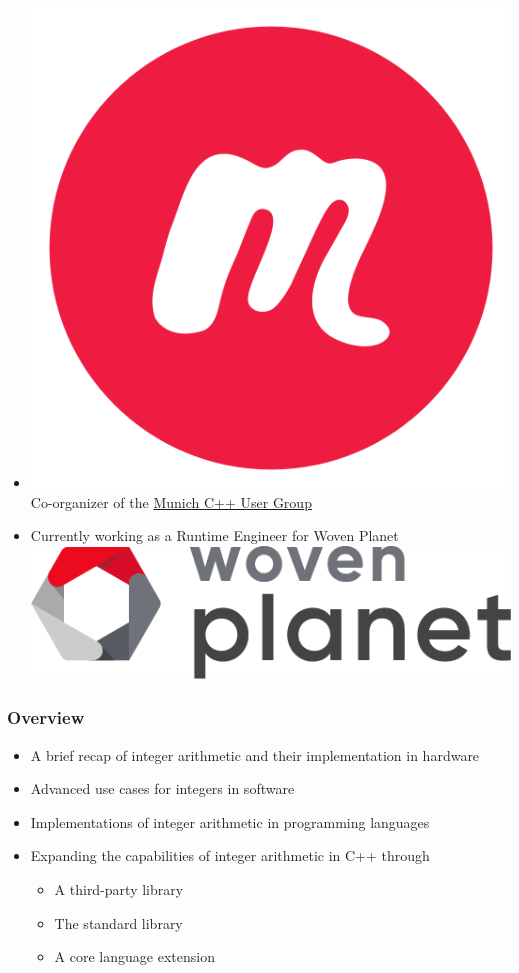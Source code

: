\documentclass[aspectratio=169]{beamer}
\begin{document}
\begin{frame}[fragile]
\begin{itemize}
    \item \includegraphics[height=.05\textheight]{resources/meetup-icon.png} Co-organizer of the \href{https://www.meetup.com/MUCplusplus/}{Munich C++ User Group}

    \item Currently working as a Runtime Engineer for Woven Planet \includegraphics[height=.1\textheight]{resources/Woven_Planet_Holdings_Logo.png}

  \end{itemize}
\end{frame}


\begin{frame}
  \frametitle{Overview}
  \begin{itemize}
  \item A brief recap of integer arithmetic and their implementation in hardware
  \item Advanced use cases for integers in software
  \item Implementations of integer arithmetic in programming languages
  \item Expanding the capabilities of integer arithmetic in C++ through
  \begin{itemize}
    \item A third-party library
    \item The standard library
    \item A core language extension
  \end{itemize}
  \end{itemize}
\end{frame}
\end{document}
